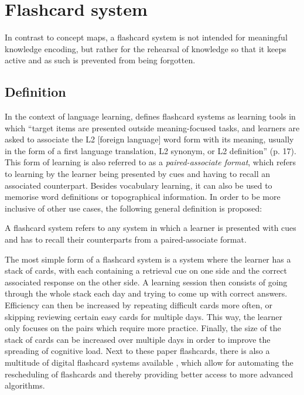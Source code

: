 \section{Flashcard system}
\label{sec:intro_fc}

In contrast to concept maps, a flashcard system is not intended for meaningful knowledge encoding, but rather for the rehearsal of knowledge so that it keeps active and as such is prevented from being forgotten.

\subsection{Definition}

In the context of language learning,  defines flashcard systems as learning tools in which ``target items are presented outside meaning-focused tasks, and learners are asked to associate the L2 [foreign language] word form with its meaning, usually in the form of a first language translation, L2 synonym, or L2 definition'' (p. 17). This form of learning is also referred to as a \emph{paired-associate format}, which refers to learning by the learner being presented by cues and having to recall an associated counterpart. Besides vocabulary learning, it can also be used to memorise word definitions or topographical information. In order to be more inclusive of other use cases, the following general definition is proposed:

\begin{definition}
    A flashcard system refers to any system in which a learner is presented with cues and has to recall their counterparts from a paired-associate format.
\end{definition}

The most simple form of a flashcard system is a system where the learner has a stack of cards, with each containing a retrieval cue on one side and the correct associated response on the other side. A learning session then consists of going through the whole stack each day and trying to come up with correct answers. Efficiency can then be increased by repeating difficult cards more often, or skipping reviewing certain easy cards for multiple days. This way, the learner only focuses on the pairs which require more practice. Finally, the size of the stack of cards can be increased over multiple days in order to improve the spreading of cognitive load. Next to these paper flashcards, there is also a multitude of digital flashcard systems available \cite{hwang2, nakata, microlearning}, which allow for automating the rescheduling of flashcards and thereby providing better access to more advanced algorithms.

